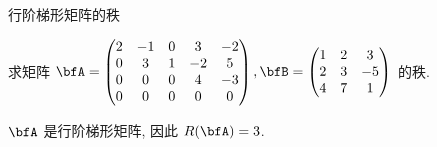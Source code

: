 \begin{frame}{行阶梯形矩阵的秩}
	\onslide<+->
	\begin{example}
		求矩阵 $\bfA=\begin{pmatrix}
			2&-1&0&3&-2\\
			0&3&1&-2&5\\
			0&0&0&4&-3\\
			0&0&0&0&0
		\end{pmatrix},\bfB=\begin{pmatrix}
			1&2&3\\
			2&3&-5\\
			4&7&1
		\end{pmatrix}$ 的秩.
	\end{example}
	\onslide<+->
	\begin{solution}
		$\bfA$ 是行阶梯形矩阵, 因此 $R(\bfA)=3$.
		\onslide<+->{\[\bfB\wsim{r_2-2r_1}{r_4-4r_1}\begin{pmatrix}
			1&2&3\\
			0&-1&-11\\
			0&-1&-11
		\end{pmatrix}\wsim{r_3-r_2}{-r_2}\begin{pmatrix}
			1&2&3\\
			0&1&11\\
			0&0&0
		\end{pmatrix}\onslide<+->{\implies R(\bfB)=2.}\]}
		\vspace{-\baselineskip}
	\end{solution}
\end{frame}


